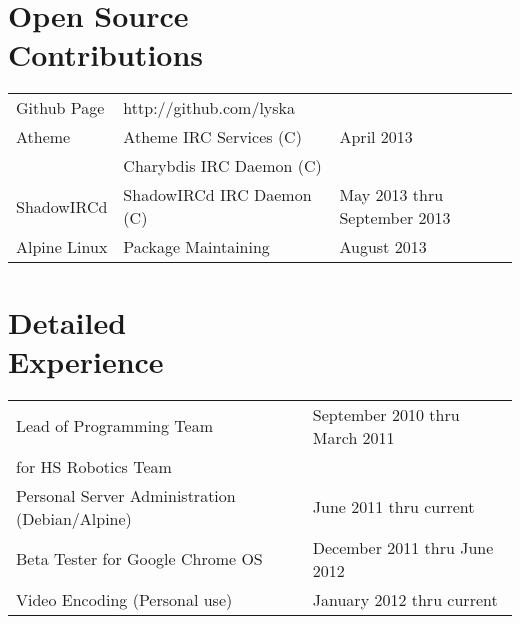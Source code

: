\documentclass[line, margin]{res}
\begin{document}
\address{5539 Columbia Pike apt 809 \\ Arlington, VA 22204 \\ +1 (425) 221-7761}
     
\begin{resume}

\section{Open Source \\ Contributions}
\begin{tabular}{l l l}
 Github Page & \hfill http://github.com/lyska & \\ [5pt]
 Atheme & \hfill Atheme IRC Services (C) & April 2013 \\ 
 & \hfill Charybdis IRC Daemon (C) \\ [5pt]
 ShadowIRCd & \hfill ShadowIRCd IRC Daemon (C) & May 2013 thru September 2013 \\ [5pt]
 Alpine Linux & \hfill Package Maintaining & August 2013 \\
\end{tabular}

\section{Detailed \\ Experience}
\begin{tabular}{l l}
 Lead of Programming Team & \hfill September 2010 thru March 2011 \\ 
 for HS Robotics Team & \\ [6pt]
 Personal Server Administration (Debian/Alpine) & \hfill June 2011 thru current  \\ [6pt]
 Beta Tester for Google Chrome OS & \hfill December 2011 thru June 2012 \\ [6pt]
 Video Encoding (Personal use) & January 2012 thru current \\ [6pt]
\end{tabular}
   

\end{resume}
\end{document}
